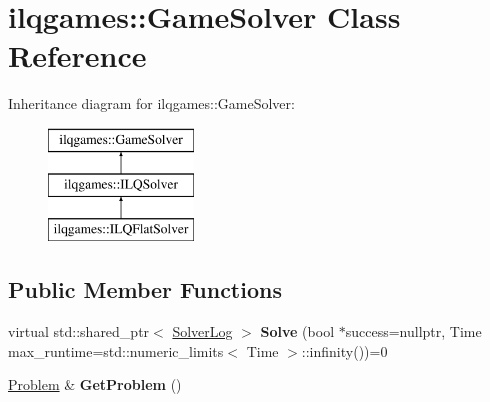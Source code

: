 \hypertarget{classilqgames_1_1_game_solver}{}\section{ilqgames\+:\+:Game\+Solver Class Reference}
\label{classilqgames_1_1_game_solver}
Inheritance diagram for ilqgames\+:\+:Game\+Solver\+:\begin{figure}[H]
\begin{center}
\leavevmode
\includegraphics[height=3.000000cm]{classilqgames_1_1_game_solver}
\end{center}
\end{figure}
\subsection*{Public Member Functions}
\begin{DoxyCompactItemize}
\item 
virtual std\+::shared\+\_\+ptr$<$ \hyperlink{classilqgames_1_1_solver_log}{Solver\+Log} $>$ {\bfseries Solve} (bool $\ast$success=nullptr, Time max\+\_\+runtime=std\+::numeric\+\_\+limits$<$ Time $>$\+::infinity())=0\hypertarget{classilqgames_1_1_game_solver_a33845e75d3148ee43f068bcb85b2d297}{}\label{classilqgames_1_1_game_solver_a33845e75d3148ee43f068bcb85b2d297}

\item 
\hyperlink{classilqgames_1_1_problem}{Problem} \& {\bfseries Get\+Problem} ()\hypertarget{classilqgames_1_1_game_solver_a03e86a0b9070715738e11b9cfbc93321}{}\label{classilqgames_1_1_game_solver_a03e86a0b9070715738e11b9cfbc93321}

\end{DoxyCompactItemize}
